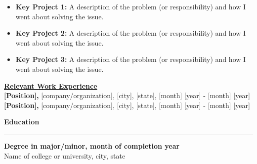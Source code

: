 \documentclass[letterpaper, 10pt]{article}
\begin{document}
\begin{itemize}
	\setlength\itemsep{0.05 em}
	\item \textbf{Key Project 1:} A description of the problem (or responsibility) and how I went about solving the issue.
	\item \textbf{Key Project 2:} A description of the problem (or responsibility) and how I went about solving the issue.
	\item \textbf{Key Project 3:} A description of the problem (or responsibility) and how I went about solving the issue.
\end{itemize}
\vspace*{-0.05cm}
\textbf{\underline{Relevant Work Experience}} \\[0.10cm]
\textbf{[Position],} [company/organization], [city], [state], [month] [year] - [month] [year] \\
\textbf{[Position],} [company/organization], [city], [state], [month] [year] - [month] [year] \\[0.20 cm]
\centerline{\Large{\textbf{Education}}} %
\noindent\rule[0.75ex]{\linewidth}{2.00 pt}
\vspace*{-0.75cm}
\begin{center}
\textbf{Degree in major/minor, month of completion year} \\
Name of college or university, city, state
\end{center}
\end{document}
